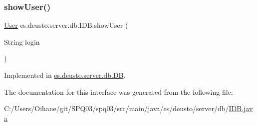 \subsubsection{\texorpdfstring{show\+User()}{showUser()}}
{\footnotesize\ttfamily \hyperlink{classes_1_1deusto_1_1server_1_1db_1_1data_1_1_user}{User} es.\+deusto.\+server.\+db.\+I\+D\+B.\+show\+User (\begin{DoxyParamCaption}\item[{String}]{login }\end{DoxyParamCaption})}



Implemented in \hyperlink{classes_1_1deusto_1_1server_1_1db_1_1_d_b_ac85523faea523033439a932bbcab2c7e}{es.\+deusto.\+server.\+db.\+DB}.



The documentation for this interface was generated from the following file\+:\begin{DoxyCompactItemize}
\item 
C\+:/\+Users/\+Oihane/git/\+S\+P\+Q03/spq03/src/main/java/es/deusto/server/db/\hyperlink{_i_d_b_8java}{I\+D\+B.\+java}\end{DoxyCompactItemize}
